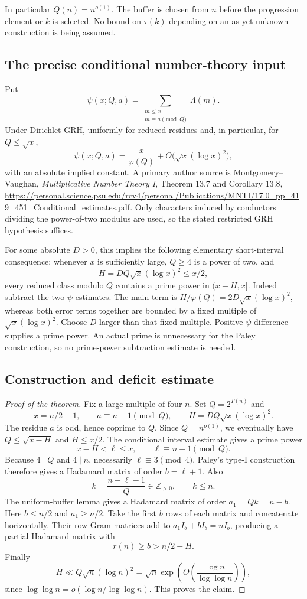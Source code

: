 In particular $Q(n)=n^{o(1)}$. The buffer is chosen from $n$ before
the progression element or $k$ is selected. No bound on $\tau(k)$
depending on an as-yet-unknown construction is being assumed.

\subsection{The precise conditional number-theory input}
Put
\[
 \psi(x;Q,a)=\sum_{\substack{m\le x\\m\equiv a\pmod Q}}\Lambda(m).
\]
Under Dirichlet GRH, uniformly for reduced residues and, in particular,
for $Q\le\sqrt x$,
\[
 \psi(x;Q,a)=\frac{x}{\varphi(Q)}+
 O\bigl(\sqrt x(\log x)^2\bigr),
\]
with an absolute implied constant. A primary author source is
Montgomery--Vaughan, \emph{Multiplicative Number Theory I},
Theorem 13.7 and Corollary 13.8,
\url{https://personal.science.psu.edu/rcv4/personal/Publications/MNTI/17.0_pp_419_451_Conditional_estimates.pdf}.
Only characters induced by conductors dividing the power-of-two
modulus are used, so the stated restricted GRH hypothesis suffices.

For some absolute $D>0$, this implies the following elementary
short-interval consequence: whenever $x$ is sufficiently large,
$Q\ge4$ is a power of two, and
\[
 H=DQ\sqrt x(\log x)^2\le x/2,
\]
every reduced class modulo $Q$ contains a prime power in $(x-H,x]$.
Indeed subtract the two $\psi$ estimates. The main term is
$H/\varphi(Q)=2D\sqrt x(\log x)^2$, whereas both error terms
together are bounded by a fixed multiple of
$\sqrt x(\log x)^2$. Choose $D$ larger than that fixed multiple.
Positive $\psi$ difference supplies a prime power. An actual prime
is unnecessary for the Paley construction, so no prime-power
subtraction estimate is needed.

\subsection{Construction and deficit estimate}
\begin{proof}[Proof of the theorem]
Fix a large multiple of four $n$. Set $Q=2^{T(n)}$ and
\[
 x=n/2-1,\qquad a\equiv n-1\pmod Q,\qquad
 H=DQ\sqrt x(\log x)^2.
\]
The residue $a$ is odd, hence coprime to $Q$. Since $Q=n^{o(1)}$,
we eventually have $Q\le\sqrt{x-H}$ and $H\le x/2$.
The conditional interval estimate gives a prime power
\[
 x-H<\ell\le x,\qquad \ell\equiv n-1\pmod Q.
\]
Because $4\mid Q$ and $4\mid n$, necessarily $\ell\equiv3\pmod4$.
Paley's type-I construction therefore gives a Hadamard matrix of
order $b=\ell+1$. Also
\[
 k=\frac{n-\ell-1}{Q}\in\mathbb Z_{>0},\qquad k\le n.
\]
The uniform-buffer lemma gives a Hadamard matrix of order
$a_1=Qk=n-b$. Here $b\le n/2$ and $a_1\ge n/2$.
Take the first $b$ rows of each matrix and concatenate horizontally.
Their row Gram matrices add to
$a_1I_b+bI_b=nI_b$, producing a partial Hadamard matrix with
\[
 r(n)\ge b>n/2-H.
\]
Finally
\[
 H\ll Q\sqrt n(\log n)^2
   =\sqrt n\exp\!\left(O\!\left(\frac{\log n}{\log\log n}\right)\right),
\]
since $\log\log n=o(\log n/\log\log n)$. This proves the claim.
\end{proof}

